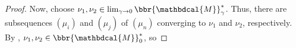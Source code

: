 \documentclass[letterpaper]{article} %
\theoremstyle{plain}
\theoremstyle{definition}
\theoremstyle{remark}
\newcommand{\dg}[1]{\mathbdcal{#1}}
\newcommand\Inc{\mathit{Inc}}
\begin{document}
\begin{proof}
%
Now, choose $\nu_1, \nu_2  \in  \lim_{\gamma\to0}\bbr{\dg
  M}_\gamma^*$. 
Thus, there are subsequences $(\mu_{i})$ and $(\mu_{j})$ of
$(\mu_n)$ converging
to $\nu_1$ and $\nu_2$, respectively.
By , $\nu_1, \nu_2 \in \bbr{\dg M}_0^*$, so

\end{proof}
\end{document}
